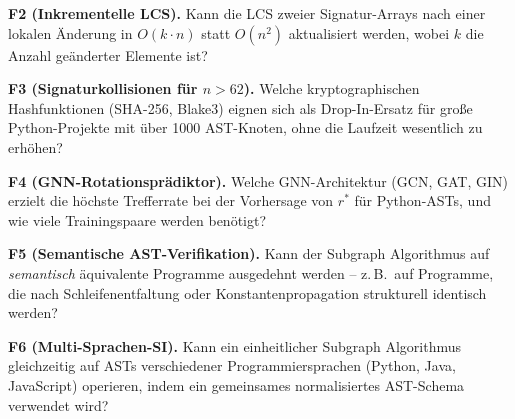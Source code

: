 ﻿\documentclass[a4paper,12pt]{article}
\theoremstyle{definition}
\begin{document}
\textbf{F2 (Inkrementelle LCS).}
Kann die LCS zweier Signatur-Arrays nach einer lokalen
\"Anderung in $O(k \cdot n)$ statt $O(n^2)$ aktualisiert
werden, wobei $k$ die Anzahl ge\"anderter Elemente ist?

\textbf{F3 (Signaturkollisionen f\"ur $n > 62$).}
Welche kryptographischen Hashfunktionen (SHA-256, Blake3)
eignen sich als Drop-In-Ersatz f\"ur gro{\ss}e Python-Projekte
mit \"uber 1000 AST-Knoten, ohne die Laufzeit wesentlich
zu erh\"ohen?

\textbf{F4 (GNN-Rotationspr\"adiktor).}
Welche GNN-Architektur (GCN, GAT, GIN) erzielt die h\"ochste
Trefferrate bei der Vorhersage von $r^*$ f\"ur Python-ASTs,
und wie viele Trainingspaare werden ben\"otigt?

\textbf{F5 (Semantische AST-Verifikation).}
Kann der Subgraph Algorithmus auf \emph{semantisch}
\"aquivalente Programme ausgedehnt werden -- z.\,B.\ auf
Programme, die nach Schleifenentfaltung oder
Konstantenpropagation strukturell identisch werden?

\textbf{F6 (Multi-Sprachen-SI).}
Kann ein einheitlicher Subgraph Algorithmus gleichzeitig
auf ASTs verschiedener Programmiersprachen (Python, Java,
JavaScript) operieren, indem ein gemeinsames normalisiertes
AST-Schema verwendet wird?
\end{document}
